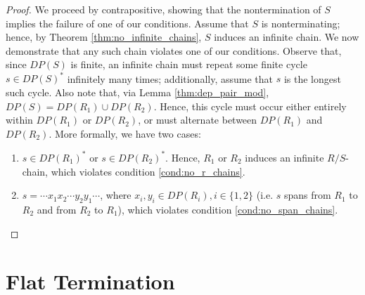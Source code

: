 \documentclass{article}
\begin{document}
\begin{proof}
    We proceed by contrapositive, showing that the nontermination of $S$ implies the failure of one of our conditions. Assume that $S$ is nonterminating; hence, by Theorem \ref{thm:no_infinite_chains}, $S$ induces an infinite chain. We now demonstrate that any such chain violates one of our conditions. Observe that, since $DP(S)$ is finite, an infinite chain must repeat some finite cycle $s \in DP(S)^*$ infinitely many times; additionally, assume that $s$ is the longest such cycle. Also note that, via Lemma \ref{thm:dep_pair_mod}, $DP(S) = DP(R_1) \cup DP(R_2)$. Hence, this cycle must occur either entirely within $DP(R_1)$ or $DP(R_2)$, or must alternate between $DP(R_1)$ and $DP(R_2)$. More formally, we have two cases: \begin{enumerate}
        \item $s \in DP(R_1)^*$ or  $s \in DP(R_2)^*$. Hence, $R_1$ or $R_2$ induces an infinite $R/S$-chain, which violates condition \eqref{cond:no_r_chains}. 
        
        \item $s = \cdots x_1 x_2 \cdots y_2 y_1 \cdots$, where $x_i, y_i \in DP(R_i), i \in \{1, 2\}$ (i.e. $s$ spans from $R_1$ to $R_2$ and from $R_2$ to $R_1$), which violates condition \eqref{cond:no_span_chains}. 
    \end{enumerate}
\end{proof}



\section{Flat Termination}
\end{document}

